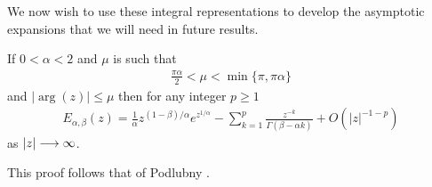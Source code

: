 We now wish to use these integral representations to develop the asymptotic expansions that we will need in future results.
\begin{mdframed}[innertopmargin=10pt]
\begin{lemma}
    \label{lem:mit_lef_asym_exp_1}
    If $ 0 < \alpha < 2 $ and $ \mu $ is such that
    \begin{align*}
        \frac{\pi \alpha}{2} < \mu < \min\{\pi, \pi\alpha \}
    \end{align*}
    and $ | \arg(z) | \leq \mu $
    then for any integer $ p \geq 1 $    
    \begin{align*}
        E_{\alpha, \beta}(z) = \frac{1}{\alpha} z^{(1 - \beta) / \alpha} e^{z^{1/\alpha}} - \sum_{k=1}^p \frac{z^{-k}}{\Gamma(\beta - \alpha k)} + O(|z|^{-1-p})
    \end{align*}
    as $ |z| \longrightarrow \infty $.
\end{lemma}
\end{mdframed}
This proof follows that of Podlubny \cite{Podlubny1999}.
